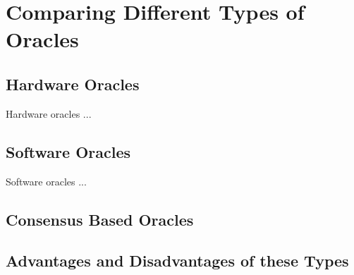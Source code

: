 \chapter{Comparing Different Types of Oracles}
\label{cha:types_of_oracles}
\section{Hardware Oracles}
Hardware oracles ...
\section{Software Oracles}
Software oracles ...
\section{Consensus Based Oracles}

\section{Advantages and Disadvantages of these Types}
